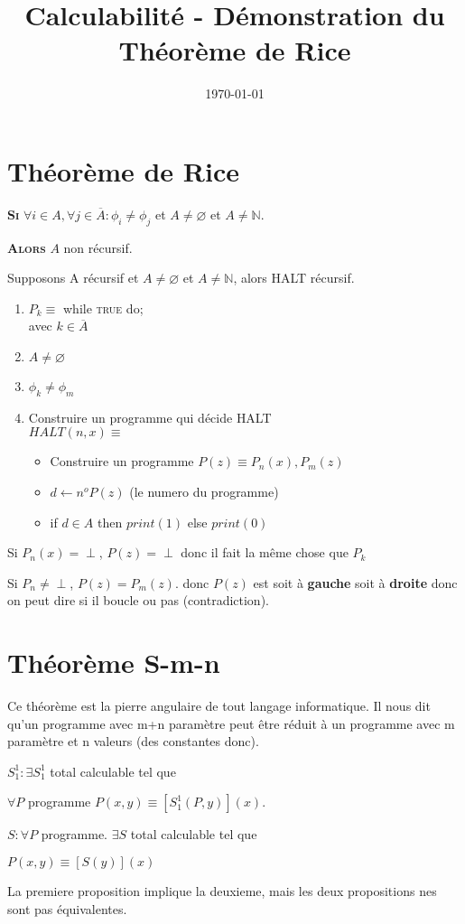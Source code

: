 \documentclass[a4paper]{article}
\title{Calculabilité - Démonstration du Théorème de Rice}
\author{}
\date{\today}
\begin{document}
\maketitle

\section{Théorème de Rice}

\textsc{\textbf{Si}} $\forall i \in A, \forall j \in \overline{A} : \phi_i \neq \phi_j$ et $A \neq \varnothing$ et $A \neq \mathbb{N}$.

\textsc{\textbf{Alors}} $A$ non récursif.

Supposons A récursif et $A \neq \varnothing$ et $A \neq \mathbb{N}$, alors \textsc{HALT} récursif.


\begin{enumerate}
	\item $P_k \equiv$ while \textsc{true} do; \\ avec $k \in \overline{A}$
	\item $A \neq \varnothing$
	\item $\phi_k \neq \phi_m$
	\item Construire un programme qui décide \textsc{HALT} \\
	$HALT(n,x)\equiv$ 
	\begin{itemize}
		\item Construire un programme $P(z) \equiv P_n(x), P_m(z)$
		\item $d \leftarrow n^o P(z)$ (le numero du programme)
		\item if $d \in A$ then $print(1)$ else $print(0)$
	\end{itemize}
\end{enumerate}

Si $P_n(x) = \perp$, $P(z) = \perp$ donc il fait la même chose que $P_k$

Si $P_n \neq \perp$, $P(z) = P_m(z)$.
donc $P(z)$ est soit à \textbf{gauche} soit à \textbf{droite} donc on peut dire si il boucle ou pas (contradiction).

\section{Théorème S-m-n}

Ce théorème est la pierre angulaire de tout langage informatique. Il nous dit qu'un programme avec m+n paramètre peut être réduit à un programme avec m paramètre et n valeurs (des constantes donc).

$S_1^1 : \exists S_1^1$ total calculable tel que 

$\forall P$ programme $P(x,y) \equiv [S_1^1(P, y)](x)$.

$S : \forall P$ programme. $\exists S$ total calculable tel que

$P(x,y) \equiv [S(y)](x)$

La premiere proposition implique la deuxieme, mais les deux propositions nes sont pas équivalentes.
\end{document}
